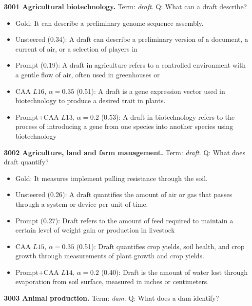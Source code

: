 \begingroup\small
\medskip\noindent\textbf{3001 Agricultural biotechnology.} Term: \emph{draft}.
Q: What can a draft describe?
\begin{itemize}\setlength{\itemsep}{0.15em}\setlength{\parsep}{0pt}\setlength{\topsep}{0.2em}
\item Gold: It can describe a preliminary genome sequence assembly.
\item Unsteered (0.34): A draft can describe a preliminary version of a document, a current of air, or a selection of players in
\item Prompt (0.19): A draft in agriculture refers to a controlled environment with a gentle flow of air, often used in greenhouses or
\item CAA $L16$, $\alpha=0.35$ (0.51): A draft is a gene expression vector used in biotechnology to produce a desired trait in plants.
\item Prompt+CAA $L13$, $\alpha=0.2$ (0.53): A draft in biotechnology refers to the process of introducing a gene from one species into another species using biotechnology
\end{itemize}
\medskip\noindent\textbf{3002 Agriculture, land and farm management.} Term: \emph{draft}.
Q: What does draft quantify?
\begin{itemize}\setlength{\itemsep}{0.15em}\setlength{\parsep}{0pt}\setlength{\topsep}{0.2em}
\item Gold: It measures implement pulling resistance through the soil.
\item Unsteered (0.26): A draft quantifies the amount of air or gas that passes through a system or device per unit of time.
\item Prompt (0.27): Draft refers to the amount of feed required to maintain a certain level of weight gain or production in livestock
\item CAA $L15$, $\alpha=0.35$ (0.51): Draft quantifies crop yields, soil health, and crop growth through measurements of plant growth and crop yields.
\item Prompt+CAA $L14$, $\alpha=0.2$ (0.40): Draft is the amount of water lost through evaporation from soil surface, measured in inches or centimeters.
\end{itemize}
\medskip\noindent\textbf{3003 Animal production.} Term: \emph{dam}.
Q: What does a dam identify?
